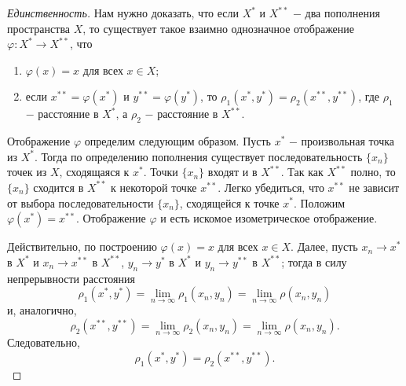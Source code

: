 \documentclass{article}
\begin{document}
\begin{proof}[Единственность]
Нам нужно доказать, что если \(X^*\) и \(X^{**}\) \(-\) два пополнения пространства \(X\), то существует такое взаимно однозначное отображение \(\varphi : X^* \to X^{**}\), что
\begin{enumerate}
 \item \(\varphi(x) = x\) для всех \(x \in X\);
 \item если \(x^{**}=\varphi(x^{*})\) и \(y^{**}=\varphi(y^{*})\), то \(\rho_1(x^{*}, y^{*}) = \rho_2(x^{**}, y^{**})\), где \(\rho_1\) \(-\) расстояние в \(X^{*}\), а \(\rho_2\) \(-\) расстояние в \(X^{**}\).
\end{enumerate}

Отображение \(\varphi\) определим следующим образом. Пусть \(x^{*}\) \(-\) произвольная точка из \(X^{*}\). Тогда по определению пополнения существует последовательность \(\{x_n\}\) точек из \(X\), сходящаяся к \(x^{*}\). Точки \(\{x_n\}\) входят и в \(X^{**}\). Так как \(X^{**}\) полно, то \(\{x_n\}\) сходится в \(X^{**}\) к некоторой точке \(x^{**}\). Легко убедиться, что \(x^{**}\) не зависит от выбора последовательности \(\{x_n\}\), сходящейся к точке \(x^{*}\). Положим \(\varphi(x^{*}) = x^{**}\). Отображение \(\varphi\) и есть искомое изометрическое отображение.

Действительно, по построению \(\varphi(x) = x\) для всех \(x \in X\). Далее, пусть \(x_n \to x^{*}\) в \(X^{*}\) и \(x_n \to x^{**}\) в \(X^{**}\), \(y_n \to y^{*}\) в \(X^{*}\) и \(y_n \to y^{**}\) в \(X^{**}\); тогда в силу непрерывности расстояния
\[
\rho_1(x^{*}, y^{*}) = \lim\limits_{n \to \infty} \rho_1(x_n, y_n) = \lim\limits_{n \to \infty} \rho(x_n, y_n)
\]
и, аналогично,
\[
\rho_2(x^{**}, y^{**}) = \lim\limits_{n \to \infty} \rho_2(x_n, y_n) = \lim\limits_{n \to \infty} \rho(x_n, y_n).
\]
Следовательно,
\[
\rho_1(x^{*}, y^{*}) = \rho_2(x^{**}, y^{**}).
\]
\end{proof}
\end{document}
